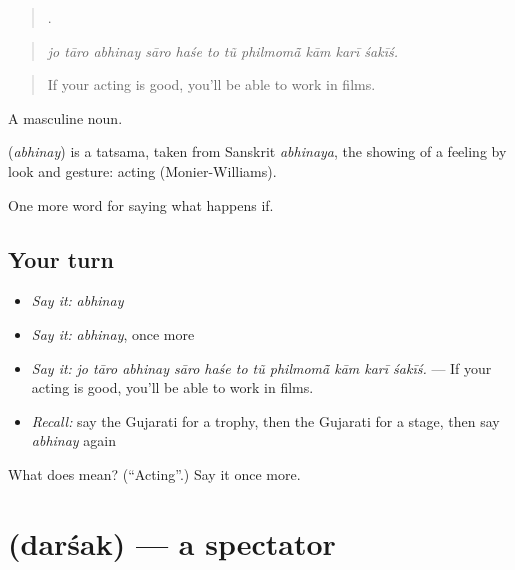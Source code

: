 \begin{quote}
          .
\end{quote}

\begin{quote}
\emph{jo tāro abhinay sāro haśe to tũ philmomā̃ kām karī śakīś.}
\end{quote}

\begin{quote}
If your acting is good, you'll be able to work in films.
\end{quote}

A masculine noun.

\begin{cousinweb}
\textbf{} (\emph{abhinay}) is a tatsama, taken from Sanskrit \emph{abhinaya}, the showing of a feeling by look and gesture: acting (Monier-Williams).
\end{cousinweb}

\begin{grammarlens}[title={What you've built}]
One more word for saying what happens if.
\end{grammarlens}

\subsection*{Your turn}
\begin{itemize}
\raggedright
  \item \emph{Say it:} \emph{abhinay}
  \item \emph{Say it:} \emph{abhinay}, once more
  \item \emph{Say it:} \emph{jo tāro abhinay sāro haśe to tũ philmomā̃ kām karī śakīś.} — If your acting is good, you'll be able to work in films.
  \item \emph{Recall:} say the Gujarati for a trophy, then the Gujarati for a stage, then say \emph{abhinay} again
\end{itemize}

\begin{tcolorbox}[breakable,colback=teal!4,colframe=teal!35!black,title={Before you move on}]
What does  mean? (\textquotedblleft{}Acting\textquotedblright{}.) Say it once more.
\end{tcolorbox}
\section[\texorpdfstring{\gu{દર્શક} (darśak)}{દર્શક (darśak)}]{ (darśak) — a spectator}

